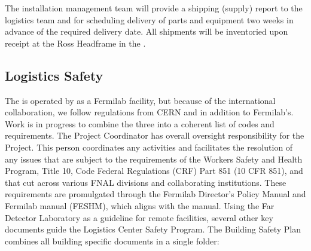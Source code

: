  
The  installation management team will provide a shipping (supply) report to the  logistics team and  for scheduling delivery of parts and equipment two weeks in advance of the required delivery date. 
All shipments will be inventoried upon receipt at the Ross Headframe in the . 




\subsection{Logistics Safety}
\label{sec:fdsp-tc-log-safety}


The   is operated by   as a Fermilab facility, but because of the international collaboration, we  follow  regulations from CERN and  in addition to Fermilab's.  Work is in progress to combine the three into a coherent list of codes and requirements. The  Project  Coordinator has overall  oversight responsibility for the  Project.  This person coordinates any  activities and facilitates the resolution of any issues that are subject to the requirements of the  Workers Safety and Health Program, Title 10, Code Federal Regulations (CRF) Part 851 (10 CFR 851), and that cut across various FNAL divisions and collaborating institutions. These requirements are promulgated through the Fermilab Director's Policy Manual  and Fermilab  manual (FESHM\cite{feshm}), which aligns with the   manual.  Using the  Far Detector Laboratory as a guideline for remote facilities, several other key documents guide the Logistics Center Safety Program.  The Building Safety Plan  combines all building specific documents in a single folder:

